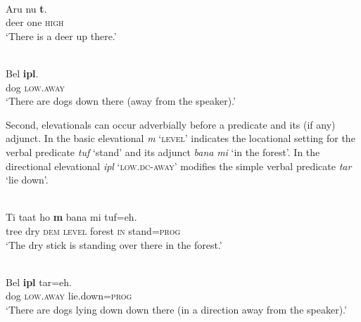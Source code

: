 \ea%
\label{ex:7:22}
 \\
\gll  Aru   nu  \textbf{{t}}\textbf{{{\textopeno}}}\textbf{{{\ng}}}{.}  \\
   deer  one  \textsc{high}   \\
\glt   `There is a deer up there.'
\z









\ea%
\label{ex:7:23}
 \\
\gll  Bel  \textbf{{ipl}}\textbf{{{\textepsilon}}}{.}  \\
  dog  \textsc{low.away}    \\
\glt   `There are dogs down there (away from the speaker).'
\z







Second, elevationals can occur adverbially before a predicate and its (if any) adjunct. In  the basic elevational \textit{m}\textit{{\textopeno}}\textit{{\ng}} `\textsc{level}' indicates the locational setting for the verbal predicate \textit{tuf} `stand' and its adjunct \textit{bana} \textit{mi} `in the forest'. In  the directional elevational \textit{ipl}\textit{{\textepsilon}} \textsc{`low.dc-away'} modifies the simple verbal predicate \textit{tar} `lie down'. 



\ea%
\label{ex:7:24}
 \\
\gll  Ti  ta{{\textglotstop}}{at}  ho  \textbf{{m}{{\textopeno}}}\textbf{{{\ng}}} {bana}  mi  {tuf=eh}. \\
    tree  dry  \textsc{dem} \textsc{level} forest  \textsc{in} stand=\textsc{prog} \\
\glt   `The dry stick is standing over there in the forest.'
\z









\ea%
\label{ex:7:25}
 \\
\gll   Bel  \textbf{ipl}\textbf{\textepsilon} tar=eh. \\
   dog  \textsc{low.away} lie.down=\textsc{prog}   \\
\glt   `There are dogs lying down down there (in a direction away from the speaker).' 
\z







